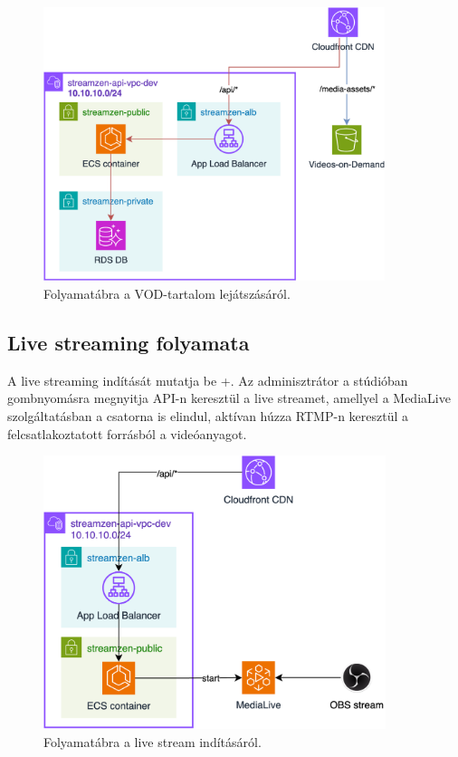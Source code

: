 \begin{figure}[h]
	\centering
	\includegraphics[height=80mm, keepaspectratio]{figures/dipterv_vod3.png}
	\caption{Folyamatábra a VOD-tartalom lejátszásáról.}
	\label{fig:vod3}
\end{figure}

\subsection{Live streaming folyamata}

A live streaming indítását mutatja be \az+. Az adminisztrátor a stúdióban gombnyomásra megnyitja API-n keresztül a live streamet, amellyel a MediaLive szolgáltatásban a csatorna is elindul, aktívan húzza RTMP-n keresztül a felcsatlakoztatott forrásból a videóanyagot.

\begin{figure}[h]
	\centering
	\includegraphics[height=80mm, keepaspectratio]{figures/dipterv_live1.png}
	\caption{Folyamatábra a live stream indításáról.}
	\label{fig:live1}
\end{figure}

